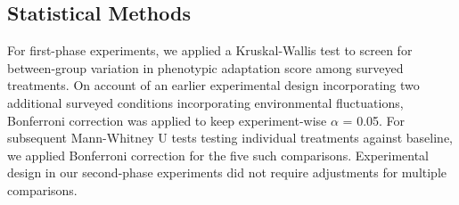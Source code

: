 



\subsection{Statistical Methods}

For first-phase experiments, we applied a Kruskal-Wallis test to screen for between-group variation in phenotypic adaptation score among surveyed treatments.
On account of an earlier experimental design incorporating two additional surveyed conditions incorporating environmental fluctuations, Bonferroni correction was applied to keep experiment-wise $\alpha$ = 0.05.
For subsequent Mann-Whitney U tests testing individual treatments against baseline, we applied Bonferroni correction for the five such comparisons.
Experimental design in our second-phase experiments did not require adjustments for multiple comparisons.

